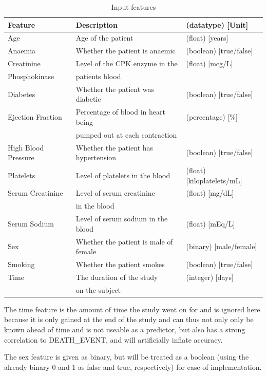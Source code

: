 \documentclass[a4paper, UKenglish]{article}
\newcommand{\0}{\mathbf{0}}
\newcommand{\1}{\mathbf{1}}
\begin{document}
\begin{table}[H]
\centering
\caption{Input features}
\label{tab:input features}
\begin{tabular}{|l|l||l|}
    \hline
    Feature & Description & (datatype) [Unit] \\
    \hline
    \hline
    Age & Age of the patient & (float) [years] \\
    \hline
    Anaemia & Whether the patient is anaemic & (boolean) [true/false] \\
    \hline
    Creatinine & Level of the CPK enzyme in the &(float) [mcg/L]  \\
    Phosphokinase &patients blood &  \\
    \hline
    Diabetes & Whether the patient was diabetic & (boolean) [true/false] \\
    \hline
    Ejection Fraction & Percentage of blood in heart being  & (percentage) [\%]  \\&pumped out at each contraction & \\
    \hline
    High Blood Pressure & Whether the patient has hypertension &(boolean) [true/false] \\
    \hline
    Platelets & Level of platelets in the blood &(float) [kiloplatelets/mL] \\
    \hline
    Serum Creatinine & Level of serum creatinine &(float) [mg/dL] \\ & in the blood &  \\
    \hline
    Serum Sodium & Level of serum sodium in the blood &(float) [mEq/L] \\
    \hline
    Sex & Whether the patient is male of female &(binary) [male/female] \\
    \hline
    Smoking &  Whether the patient smokes &(boolean) [true/false] \\
    \hline
    \hline
    Time & The duration of the study  & (integer) [days] \\
    &on the subject &\\
    \hline
\end{tabular}
\end{table}

The time feature is the amount of time the study went on for and is ignored here because it is only gained at the end of the study and can thus not only only be known ahead of time and is not useable as a predictor, but also has a strong correlation to DEATH\_EVENT, and will artificially inflate accuracy.

The sex feature is given as binary, but will be treated as a boolean (using the already binary 0 and 1 as false and true, respectively) for ease of implementation.
\end{document}
